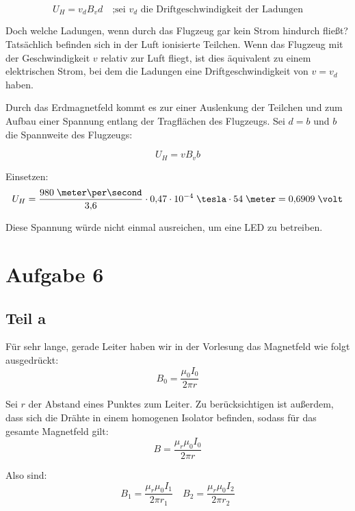 \documentclass[a4paper,german,12pt,smallheadings]{scrartcl}
\begin{document}
\begin{equation*}
U_H=v_dB_vd \quad \text{;sei $v_d$ die Driftgeschwindigkeit der Ladungen}
\end{equation*}

Doch welche Ladungen, wenn durch das Flugzeug gar kein Strom hindurch
fließt? Tatsächlich befinden sich in der Luft ionisierte Teilchen. Wenn das
Flugzeug mit der Geschwindigkeit $v$ relativ zur Luft fliegt, ist dies
äquivalent zu einem elektrischen Strom, bei dem die Ladungen eine
Driftgeschwindigkeit von $v=v_d$ haben.

Durch das Erdmagnetfeld kommt es zur einer Auslenkung der Teilchen und zum
Aufbau einer Spannung entlang der Tragflächen des Flugzeugs. Sei $d=b$ und $b$
die Spannweite des Flugzeugs:

\begin{equation*}
U_H=vB_vb
\end{equation*}

Einsetzen:
\begin{equation*}
U_H=\frac{980 \;\meter\per\second}{3{,}6}\cdot 0{,}47 \cdot 10^{-4} \;\tesla \cdot 54 \;\meter = 0{,}6909 \;\volt
\end{equation*}

Diese Spannung würde nicht einmal ausreichen, um eine LED zu betreiben.

\section*{Aufgabe 6}
\subsection *{Teil a}

Für sehr lange, gerade Leiter haben wir in der Vorlesung das Magnetfeld wie
folgt ausgedrückt:
\begin{equation*}
B_0=\frac{\mu_0 I_0}{2\pi r}
\end{equation*}

Sei $r$ der Abstand eines Punktes zum Leiter. Zu berücksichtigen ist außerdem,
dass sich die Drähte in einem homogenen Isolator befinden, sodass für das
gesamte Magnetfeld gilt:
\begin{equation*}
B = \frac{\mu_r \mu_0 I_0}{2\pi r}
\end{equation*}

Also sind:
\begin{equation*}
B_1 = \frac{\mu_r \mu_0 I_1}{2\pi r_1} \quad B_2 = \frac{\mu_r \mu_0 I_2}{2\pi r_2}
\end{equation*}
\end{document}

